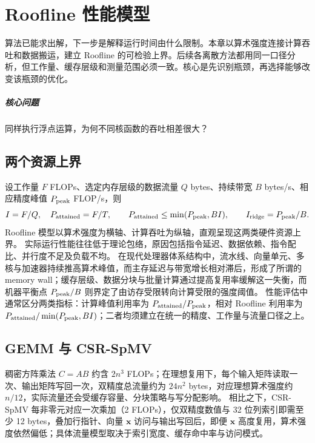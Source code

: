 \chapter{Roofline 性能模型}\label{v0ch:22}
\begin{chaptersummary}
算法已能求出解，下一步是解释运行时间由什么限制。本章以算术强度连接计算吞吐和数据搬运，建立 Roofline 的可检验上界。后续各离散方法都用同一口径分析，但工作量、缓存层级和测量范围必须一致。核心是先识别瓶颈，再选择能够改变该瓶颈的优化。
\end{chaptersummary}
\paragraph{核心问题}同样执行浮点运算，为何不同核函数的吞吐相差很大？

\section{两个资源上界}
设工作量 $F$ FLOPs、选定内存层级的数据流量 $Q$ bytes、持续带宽 $B$ bytes/s、相应精度峰值 $P_{\rm peak}$ FLOP/s，则
\[
 I=F/Q,\quad P_{\rm attained}=F/T,\qquad
 P_{\rm attained}\le\min(P_{\rm peak},BI),\qquad
 I_{\rm ridge}=P_{\rm peak}/B.
\]
Roofline 模型以算术强度为横轴、计算吞吐为纵轴，直观呈现这两类硬件资源上界。\cite{roofline}
实际运行性能往往低于理论包络，原因包括指令延迟、数据依赖、指令配比、并行度不足及负载不均。
在现代处理器体系结构中，流水线、向量单元、多核与加速器持续推高算术峰值，而主存延迟与带宽增长相对滞后，形成了所谓的 memory wall；缓存层级、数据分块与批量计算通过提高复用率缓解这一失衡，而机器平衡点 $P_{\rm peak}/B$ 则界定了由访存受限转向计算受限的强度阈值。\cite{architecture}
性能评估中通常区分两类指标：计算峰值利用率为 $P_{\rm attained}/P_{\rm peak}$，相对 Roofline 利用率为 $P_{\rm attained}/\min(P_{\rm peak},BI)$；二者均须建立在统一的精度、工作量与流量口径之上。
\section{GEMM 与 CSR-SpMV}
稠密方阵乘法 $C=AB$ 约含 $2n^3$ FLOPs；在理想复用下，每个输入矩阵读取一次、输出矩阵写回一次，双精度总流量约为 $24n^2$ bytes，对应理想算术强度约 $n/12$，实际流量还会受缓存容量、分块策略与写分配影响。
相比之下，CSR-SpMV 每非零元对应一次乘加（2 FLOPs），仅双精度数值与 32 位列索引即需至少 12 bytes，叠加行指针、向量 $\bm x$ 访问与输出写回后，即便 $\bm x$ 高度复用，算术强度依然偏低；具体流量模型取决于索引宽度、缓存命中率与访问模式。
